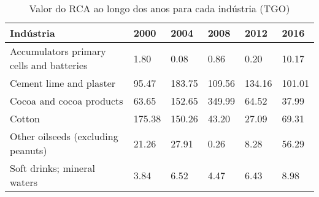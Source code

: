 \begin{table}
\centering
\caption{Valor do RCA ao longo dos anos para cada indústria (TGO)}
\label{tab:ex3-tempo-TGO}
\begin{tabular}{p{6cm}p{1.5cm}p{1.5cm}p{1.5cm}p{1.5cm}p{1.5cm}}
\toprule
                               Indústria &   2000 &   2004 &   2008 &   2012 &   2016 \\
\midrule
Accumulators primary cells and batteries &   1.80 &   0.08 &   0.86 &   0.20 &  10.17 \\
                 Cement lime and plaster &  95.47 & 183.75 & 109.56 & 134.16 & 101.01 \\
                Cocoa and cocoa products &  63.65 & 152.65 & 349.99 &  64.52 &  37.99 \\
                                  Cotton & 175.38 & 150.26 &  43.20 &  27.09 &  69.31 \\
      Other oilseeds (excluding peanuts) &  21.26 &  27.91 &   0.26 &   8.28 &  56.29 \\
             Soft drinks; mineral waters &   3.84 &   6.52 &   4.47 &   6.43 &   8.98 \\
\bottomrule
\end{tabular}
\end{table}
